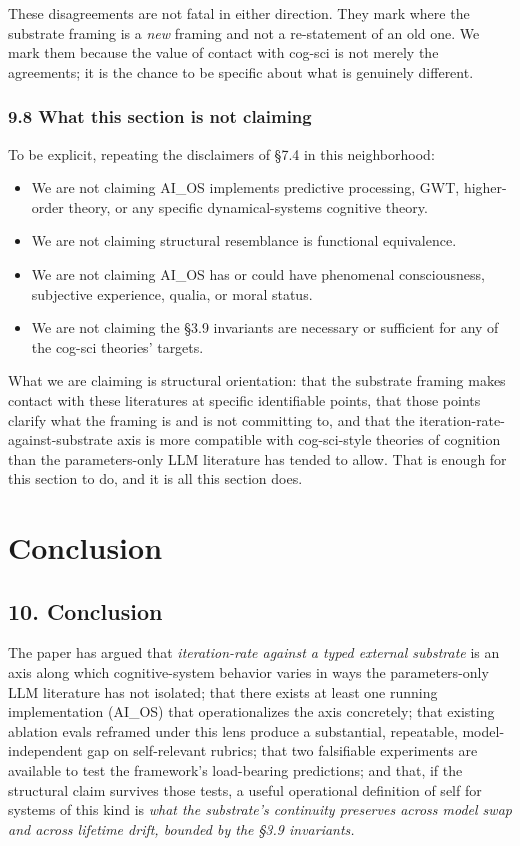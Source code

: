 \documentclass[11pt,letterpaper]{article}
\begin{document}
These disagreements are not fatal in either direction. They mark where the substrate framing is a \emph{new} framing and not a re-statement of an old one. We mark them because the value of contact with cog-sci is not merely the agreements; it is the chance to be specific about what is genuinely different.

\subsubsection*{9.8 What this section is not claiming}

To be explicit, repeating the disclaimers of §7.4 in this neighborhood:

\begin{itemize}
  \item We are not claiming AI\_OS implements predictive processing, GWT, higher-order theory, or any specific dynamical-systems cognitive theory.
  \item We are not claiming structural resemblance is functional equivalence.
  \item We are not claiming AI\_OS has or could have phenomenal consciousness, subjective experience, qualia, or moral status.
  \item We are not claiming the §3.9 invariants are necessary or sufficient for any of the cog-sci theories' targets.
\end{itemize}

What we are claiming is structural orientation: that the substrate framing makes contact with these literatures at specific identifiable points, that those points clarify what the framing is and is not committing to, and that the iteration-rate-against-substrate axis is more compatible with cog-sci-style theories of cognition than the parameters-only LLM literature has tended to allow. That is enough for this section to do, and it is all this section does.

\section{Conclusion}
\subsection*{10. Conclusion}

The paper has argued that \emph{iteration-rate against a typed external substrate} is an axis along which cognitive-system behavior varies in ways the parameters-only LLM literature has not isolated; that there exists at least one running implementation (AI\_OS) that operationalizes the axis concretely; that existing ablation evals reframed under this lens produce a substantial, repeatable, model-independent gap on self-relevant rubrics; that two falsifiable experiments are available to test the framework's load-bearing predictions; and that, if the structural claim survives those tests, a useful operational definition of self for systems of this kind is \emph{what the substrate's continuity preserves across model swap and across lifetime drift, bounded by the §3.9 invariants.}
\end{document}
